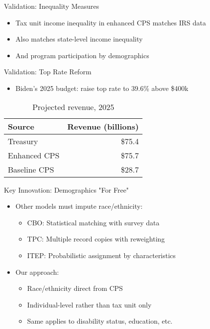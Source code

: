 \documentclass{beamer}
\begin{document}
\begin{frame}{Validation: Inequality Measures}
    \begin{itemize}
        \item Tax unit income inequality in enhanced CPS matches IRS data
        \begin{table}
            \centering
            
        \end{table}
        \pause
        \item Also matches state-level income inequality
        \item And program participation by demographics
    \end{itemize}
\end{frame}

\begin{frame}{Validation: Top Rate Reform}
    \begin{itemize}
        \item Biden's 2025 budget: raise top rate to 39.6\% above \$400k
    \end{itemize}
    \begin{table}
        \centering
        \begin{tabular}{lr}
            \toprule
            Source & Revenue (billions) \\
            \midrule
            Treasury & \$75.4 \\
            Enhanced CPS & \$75.7 \\
            Baseline CPS & \$28.7 \\
            \bottomrule
        \end{tabular}
        \caption{Projected revenue, 2025}
    \end{table}
\end{frame}

\begin{frame}{Key Innovation: Demographics "For Free"}
    \begin{itemize}
        \item Other models must impute race/ethnicity:
        \begin{itemize}
            \item CBO: Statistical matching with survey data
            \item TPC: Multiple record copies with reweighting
            \item ITEP: Probabilistic assignment by characteristics
        \end{itemize}
        \pause
        \item Our approach:
        \begin{itemize}
            \item Race/ethnicity direct from CPS
            \item Individual-level rather than tax unit only
            \item Same applies to disability status, education, etc.
        \end{itemize}
    \end{itemize}
\end{frame}
\end{document}
